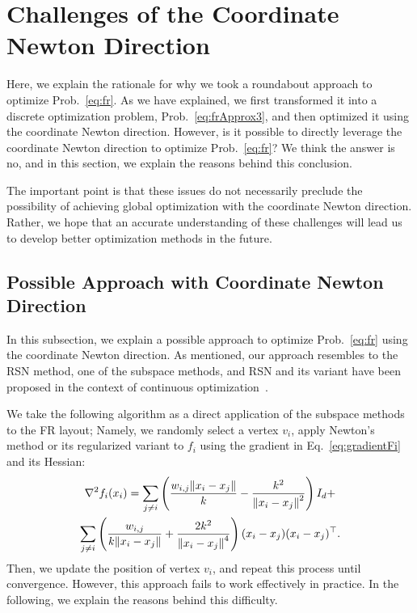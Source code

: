 \documentclass[dvipdfmx,10pt,journal,compsoc]{IEEEtran}
\begin{document}
\section{Challenges of the Coordinate Newton Direction}\label{sec:challenges}

Here, we explain the rationale for why we took a roundabout approach to optimize Prob.~\eqref{eq:fr}.
As we have explained, we first transformed it into a discrete optimization problem, Prob.~\eqref{eq:frApprox3}, and then optimized it using the coordinate Newton direction. However, is it possible to directly leverage the coordinate Newton direction to optimize Prob.~\eqref{eq:fr}?
We think the answer is no, and in this section, we explain the reasons behind this conclusion.

The important point is that these issues do not necessarily preclude the possibility of achieving global optimization with the coordinate Newton direction.
Rather, we hope that an accurate understanding of these challenges will lead us to develop better optimization methods in the future.

\subsection{Possible Approach with Coordinate Newton Direction}\label{ssec:possibleApproach}

In this subsection, we explain a possible approach to optimize Prob.~\eqref{eq:fr} using the coordinate Newton direction.
As mentioned, our approach resembles to the RSN method, one of the subspace methods, and RSN and its variant have been proposed in the context of continuous optimization~\cite{NEURIPS2019_bc6dc48b,
  fujiRandomizedSubspaceRegularized2022,
  cartisRandomisedSubspaceMethods2022,
  nozawaRandomizedSubspaceGradient2023,
  higuchiFastConvergenceSecondOrder2024}.

We take the following algorithm as a direct application of the subspace methods to the FR layout; Namely, we randomly select a vertex $v_i$, apply Newton's method or its regularized variant to $f_i$ using the gradient in Eq.~\eqref{eq:gradientFi} and its Hessian:
\begin{gather*}
  \nabla^2 f_i(x_i) = \sum_{j \neq i} \left(\frac{w_{i,j}\norm{x_i - x_j}}{k} - \frac{k^2}{\norm{x_i - x_j}^2}\right) I_d + \\
  \sum_{j \neq i} \left(\frac{w_{i,j}}{k \norm{x_i - x_j}} + \frac{2k^2}{\norm{x_i - x_j}^4}\right) (x_i - x_j)(x_i - x_j)^\top.
\end{gather*}
Then, we update the position of vertex $v_i$, and repeat this process until convergence.
However, this approach fails to work effectively in practice.
In the following, we explain the reasons behind this difficulty.
\end{document}
